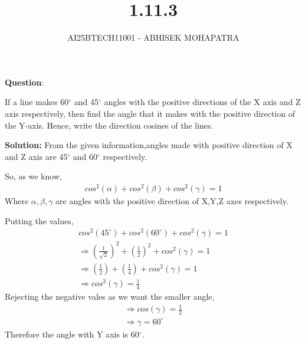 \documentclass{beamer}
\title{1.11.3}
\author{AI25BTECH11001 - ABHISEK MOHAPATRA}
\theoremstyle{remark}
\numberwithin{equation}{section}
\begin{document}
{\let\newpage\relax\maketitle}

		\textbf{Question}:

	 If a line makes 60$^\circ$ and 45$^\circ$ angles with the 
	 positive directions of the X axis and Z axis respectively, then find the angle that it makes 
	 with the positive direction of the Y-axis. Hence, write the direction cosines of the lines.

		\textbf{Solution:} From the given information,angles made with positive direction of X and Z axis are 45$^\circ$ and 60$^\circ$ respectively.
		
		So, as we know,
		\begin{align}
			cos^2(\alpha) + cos^2(\beta) + cos^2(\gamma) = 1 
		\end{align}
		Where $\alpha,\beta,\gamma$ are angles with the positive direction of X,Y,Z axes respectively.


		Putting the values, 
		\begin{align}
			cos^2(45^\circ) + cos^2(60^\circ) + cos^2(\gamma) = 1 
			\\
			\Rightarrow	(\frac{1}{\sqrt{2}})^2 + (\frac{1}{2})^2 + cos^2(\gamma) = 1
			\\
			\Rightarrow	(\frac{1}{{2}}) + (\frac{1}{4}) + cos^2(\gamma) = 1
			\\
			\Rightarrow	cos^2(\gamma) = \frac{1}{4}
		\end{align}
		Rejecting the negative vales as we want the smaller angle,
		\begin{align}
			\Rightarrow	cos(\gamma) = \frac{1}{2}
			\\
			\Rightarrow     \gamma = 60^\circ
		\end{align}
		Therefore the angle with Y axis is 60$^\circ$.
\end{document}
